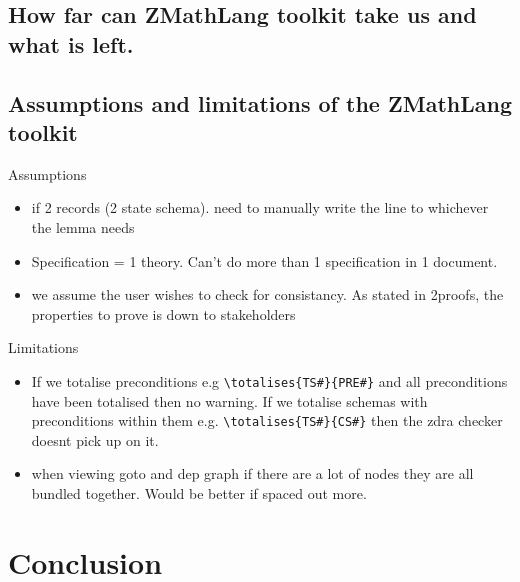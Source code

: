\subsection{How far can ZMathLang toolkit take us and what is left.}


\subsection{Assumptions and limitations of the ZMathLang toolkit}
Assumptions

\begin{itemize}
\item if 2 records (2 state schema). need to manually write the line to whichever the lemma needs

\item Specification = 1 theory. Can't do more than 1 specification in 1 document.

\item we assume the user wishes to check for consistancy. As stated in 2proofs, the properties to prove is down to stakeholders
\end{itemize}

Limitations

\begin{itemize}
\item If we totalise preconditions e.g \verb|\totalises{TS#}{PRE#}| and all preconditions have been totalised then no warning. If we totalise schemas with preconditions within them e.g. \verb|\totalises{TS#}{CS#}| then the \gls{zdra} checker doesnt pick up on it.

\item when viewing goto and dep graph if there are a lot of nodes they are all bundled together. Would be better if spaced out more.
\end{itemize}

\section{Conclusion}

